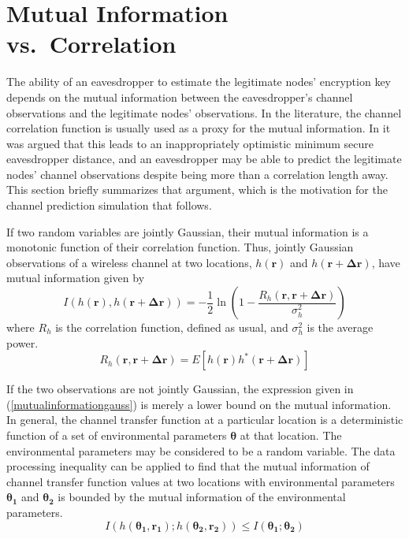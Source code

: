 \documentclass{allertonproc}
\begin{document}
\section{Mutual Information vs.~Correlation}\label{mutualinfo} %
The ability of an eavesdropper to estimate the legitimate nodes' encryption key depends on the mutual information between the eavesdropper's channel observations and the legitimate nodes' observations.  In the literature, the channel correlation function is usually used as a proxy for the mutual information.  In \cite{kckpVTC2015} it was argued that this leads to an inappropriately optimistic minimum secure eavesdropper distance, and an eavesdropper may be able to predict the legitimate nodes' channel observations despite being more than a correlation length away.  This section briefly summarizes that argument, which is the motivation for the channel prediction simulation that follows.

If two random variables are jointly Gaussian, their mutual information is a monotonic function of their correlation function.  Thus, jointly Gaussian observations of a wireless channel at two locations, $h(\mathbf{r})$ and $h(\mathbf{r}+\mathbf{\Delta r})$, have mutual information given by 
\begin{equation}\label{mutualinformationgauss}
I(h(\mathbf{r}),h(\mathbf{r}+\mathbf{\Delta r})) = -\frac{1}{2}\ln\left(1-\frac{R_h(\mathbf{r},\mathbf{r}+\mathbf{\Delta r})}{\sigma_h^2}\right)
\end{equation}
where $R_h$ is the correlation function, defined as usual, and $\sigma_h^2$ is the average power.
\begin{equation}
R_h(\mathbf{r},\mathbf{r}+\mathbf{\Delta r}) = E[h(\mathbf{r})h^*(\mathbf{r}+\mathbf{\Delta r})]
\end{equation}

If the two observations are not jointly Gaussian, the expression given in (\ref{mutualinformationgauss}) is merely a lower bound on the mutual information.  In general, the channel transfer function at a particular location is a deterministic function of a set of environmental parameters $\boldsymbol{\theta}$ at that location. The environmental parameters may be considered to be a random variable. The data processing inequality can be applied to find that the mutual information of channel transfer function values at two locations with environmental parameters $\boldsymbol{\theta_1}$ and $\boldsymbol{\theta_2}$ is bounded by the mutual information of the environmental parameters.
\begin{equation}\label{ineq1}
I(h(\boldsymbol{\theta_1},\mathbf{r_1}); h(\boldsymbol{\theta_2},\mathbf{r_2}))\leq I(\boldsymbol{\theta_1}; \boldsymbol{\theta_2})
\end{equation}
\end{document}
